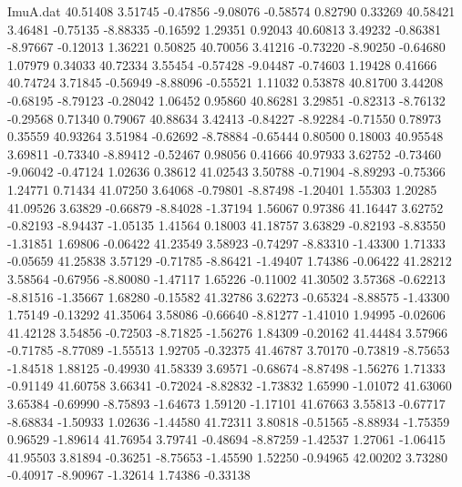 \begin{filecontents}{ImuA.dat}
  40.51408    3.51745   -0.47856   -9.08076   -0.58574    0.82790    0.33269
  40.58421    3.46481   -0.75135   -8.88335   -0.16592    1.29351    0.92043
  40.60813    3.49232   -0.86381   -8.97667   -0.12013    1.36221    0.50825
  40.70056    3.41216   -0.73220   -8.90250   -0.64680    1.07979    0.34033
  40.72334    3.55454   -0.57428   -9.04487   -0.74603    1.19428    0.41666
  40.74724    3.71845   -0.56949   -8.88096   -0.55521    1.11032    0.53878
  40.81700    3.44208   -0.68195   -8.79123   -0.28042    1.06452    0.95860
  40.86281    3.29851   -0.82313   -8.76132   -0.29568    0.71340    0.79067
  40.88634    3.42413   -0.84227   -8.92284   -0.71550    0.78973    0.35559
  40.93264    3.51984   -0.62692   -8.78884   -0.65444    0.80500    0.18003
  40.95548    3.69811   -0.73340   -8.89412   -0.52467    0.98056    0.41666
  40.97933    3.62752   -0.73460   -9.06042   -0.47124    1.02636    0.38612
  41.02543    3.50788   -0.71904   -8.89293   -0.75366    1.24771    0.71434
  41.07250    3.64068   -0.79801   -8.87498   -1.20401    1.55303    1.20285
  41.09526    3.63829   -0.66879   -8.84028   -1.37194    1.56067    0.97386
  41.16447    3.62752   -0.82193   -8.94437   -1.05135    1.41564    0.18003
  41.18757    3.63829   -0.82193   -8.83550   -1.31851    1.69806   -0.06422
  41.23549    3.58923   -0.74297   -8.83310   -1.43300    1.71333   -0.05659
  41.25838    3.57129   -0.71785   -8.86421   -1.49407    1.74386   -0.06422
  41.28212    3.58564   -0.67956   -8.80080   -1.47117    1.65226   -0.11002
  41.30502    3.57368   -0.62213   -8.81516   -1.35667    1.68280   -0.15582
  41.32786    3.62273   -0.65324   -8.88575   -1.43300    1.75149   -0.13292
  41.35064    3.58086   -0.66640   -8.81277   -1.41010    1.94995   -0.02606
  41.42128    3.54856   -0.72503   -8.71825   -1.56276    1.84309   -0.20162
  41.44484    3.57966   -0.71785   -8.77089   -1.55513    1.92705   -0.32375
  41.46787    3.70170   -0.73819   -8.75653   -1.84518    1.88125   -0.49930
  41.58339    3.69571   -0.68674   -8.87498   -1.56276    1.71333   -0.91149
  41.60758    3.66341   -0.72024   -8.82832   -1.73832    1.65990   -1.01072
  41.63060    3.65384   -0.69990   -8.75893   -1.64673    1.59120   -1.17101
  41.67663    3.55813   -0.67717   -8.68834   -1.50933    1.02636   -1.44580
  41.72311    3.80818   -0.51565   -8.88934   -1.75359    0.96529   -1.89614
  41.76954    3.79741   -0.48694   -8.87259   -1.42537    1.27061   -1.06415
  41.95503    3.81894   -0.36251   -8.75653   -1.45590    1.52250   -0.94965
  42.00202    3.73280   -0.40917   -8.90967   -1.32614    1.74386   -0.33138

\end{filecontents}
